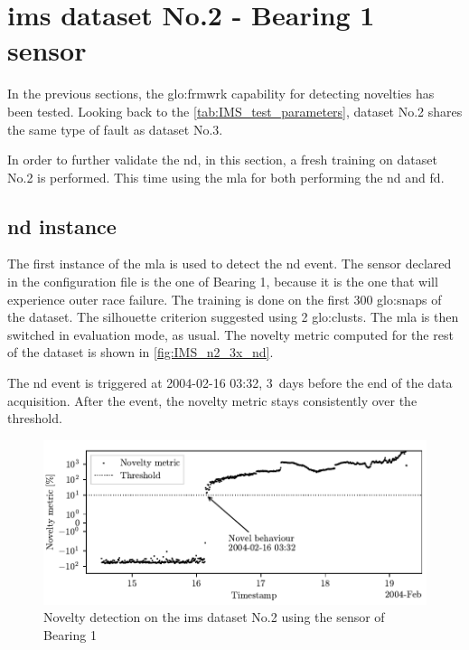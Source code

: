 \section{\gls{ims} dataset No.2 - Bearing 1 sensor}
\label{sec:IMS_n2_3x}

In the previous sections, the \gls{glo:frmwrk} capability for detecting novelties has been tested. Looking back to the \autoref{tab:IMS_test_parameters}, dataset No.2 shares the same type of fault as dataset No.3.

In order to further validate the \gls{nd}, in this section, a fresh training on dataset No.2 is performed. This time using the \gls{mla} for both performing the \gls{nd} and \gls{fd}.

\subsection{\gls{nd} instance}
The first instance of the \gls{mla} is used to detect the \gls{nd} event. The sensor declared in the configuration file is the one of Bearing 1, because it is the one that will experience outer race failure. The training is done on the first 300 \gls{glo:snap}s of the dataset. The silhouette criterion suggested using 2 \gls{glo:clust}s. The \gls{mla} is then switched in evaluation mode, as usual. The novelty metric computed for the rest of the dataset is shown in \autoref{fig:IMS_n2_3x_nd}. 

The \gls{nd} event is triggered at 2004-02-16 03:32, 3~days before the end of the data acquisition. After the event, the novelty metric stays consistently over the threshold. 

\begin{figure}
    \centering
    \includegraphics{images/IMS/Test02/ND.pdf}
    \caption{Novelty detection on the \gls{ims} dataset No.2 using the sensor of Bearing 1}
    \label{fig:IMS_n2_3x_nd}
\end{figure}

